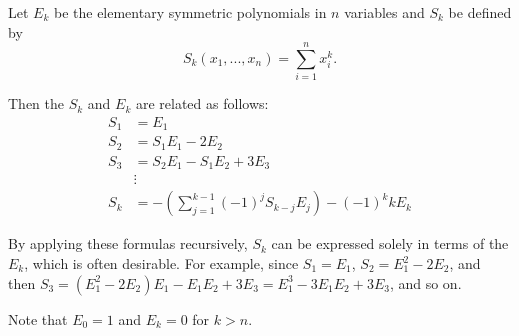 \documentclass[12pt]{article}
\begin{document}
Let $E_k$ be the elementary symmetric polynomials in $n$ variables and $S_k$ be defined by 
\[ S_k(x_1, ... , x_n) = \sum_{i=1}^n{x_i^k}. \]

Then the $S_k$ and $E_k$ are related as follows:
\begin{align*}
S_1 &= E_1 \\
S_2 &= S_1 E_1 - 2E_2 \\
S_3 &= S_2 E_1 - S_1 E_2 + 3E_3\\
 &\vdots \\
S_k &= -\left(\sum_{j=1}^{k-1} {(-1)^j S_{k-j} E_j} \right) - (-1)^k k E_k 
\end{align*}



By applying these formulas recursively, $S_k$ can be expressed solely in terms of the $E_k$, which is often desirable. For example, since $S_1 = E_1$, $S_2 = E_1^2 - 2E_2$, and then $S_3 = (E_1^2-2E_2)E_1 - E_1 E_2 + 3E_3 = E_1^3 - 3E_1 E_2 + 3E_3$, and so on.

Note that $E_0 = 1$ and  $E_k=0$ for $k > n$.
\end{document}
